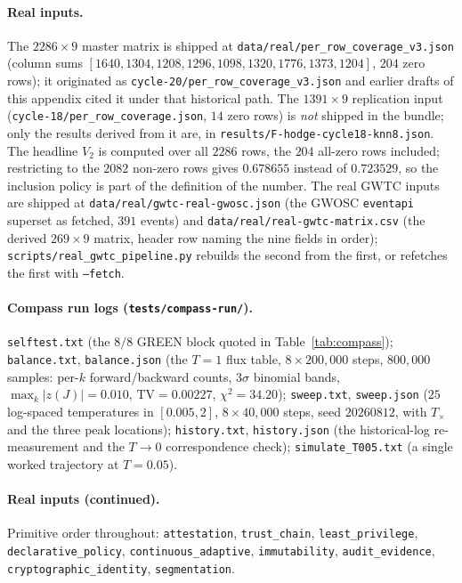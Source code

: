 \documentclass[11pt,a4paper]{article}
\theoremstyle{plain}
\theoremstyle{remark}
\theoremstyle{plain}
\begin{document}
\paragraph{Real inputs.}
The $2286\times9$ master matrix is shipped at \texttt{data/real/per\_row\_coverage\_v3.json} (column sums $[1640,1304,1208,1296,1098,1320,1776,1373,1204]$, $204$ zero rows); it originated as \texttt{cycle-20/per\_row\_coverage\_v3.json} and earlier drafts of this appendix cited it under that historical path. The $1391\times9$ replication input (\texttt{cycle-18/per\_row\_coverage.json}, $14$ zero rows) is \emph{not} shipped in the bundle; only the results derived from it are, in \texttt{results/F-hodge-cycle18-knn8.json}. The headline $V_2$ is computed over all $2286$ rows, the $204$ all-zero rows included; restricting to the $2082$ non-zero rows gives $0.678655$ instead of $0.723529$, so the inclusion policy is part of the definition of the number. The real GWTC inputs are shipped at \texttt{data/real/gwtc-real-gwosc.json} (the GWOSC \texttt{eventapi} superset as fetched, $391$ events) and \texttt{data/real/real-gwtc-matrix.csv} (the derived $269\times9$ matrix, header row naming the nine fields in order); \texttt{scripts/real\_gwtc\_pipeline.py} rebuilds the second from the first, or refetches the first with \texttt{--fetch}. \paragraph{Compass run logs (\texttt{tests/compass-run/}).}
\texttt{selftest.txt} (the $8/8$ GREEN block quoted in Table~\ref{tab:compass});
\texttt{balance.txt}, \texttt{balance.json} (the $T=1$ flux table, $8\times200{,}000$
steps, $800{,}000$ samples: per-$k$ forward/backward counts, $3\sigma$ binomial
bands, $\max_k|z(J)|=0.010$, $\mathrm{TV}=0.00227$, $\chi^2=34.20$);
\texttt{sweep.txt}, \texttt{sweep.json} ($25$ log-spaced temperatures in
$[0.005,2]$, $8\times40{,}000$ steps, seed $20260812$, with $T_\times$ and the three
peak locations); \texttt{history.txt}, \texttt{history.json} (the historical-log
re-measurement and the $T\to0$ correspondence check);
\texttt{simulate\_T005.txt} (a single worked trajectory at $T=0.05$).

\paragraph{Real inputs (continued).}
Primitive order throughout: \texttt{attestation}, \texttt{trust\_chain}, \texttt{least\_privilege}, \texttt{declarative\_policy}, \texttt{continuous\_adaptive}, \texttt{immutability}, \texttt{audit\_evidence}, \texttt{cryptographic\_identity}, \texttt{segmentation}.
\end{document}
